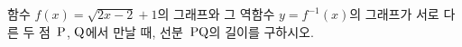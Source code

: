 \hspace*{2mm}\begin{minipage}[t]{\dimexpr\linewidth-2mm\relax}\vspace{0pt}
함수 $f(x)=\sqrt{2x-2}+1$의 그래프와 그 역함수 $y=f^{-1}(x)$의 그래프가 서로 다른 두 점~$\mathrm{P}$, $\mathrm{Q}$에서 만날 때, 선분~$\mathrm{PQ}$의 길이를 구하시오.\end{minipage}
